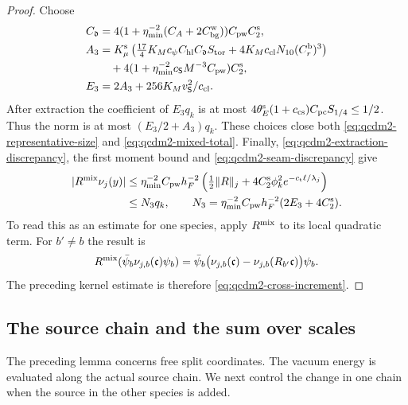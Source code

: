\documentclass[11pt,letterpaper,reqno]{amsart}
\theoremstyle{definition}
\theoremstyle{remark}
\begin{document}
\begin{proof}
Choose
\[
 \begin{split}
 C_{\mathfrak d}
 &=4(1+\eta_{\min}^{-2}(C_A+2C_{\rm bg}^{\rm w}))
                                      C_{\rm pw}C_2^{\rm s},\\
 A_3&=K_\mu^{\rm s}\left(
       \tfrac{17}{4}K_Mc_\psi C_{\rm hl}C_{\mathfrak d}S_{\rm tor}
           +4K_Mc_{\rm cl}N_{10}(C_r^{\rm b})^3\right)\\
 &\hspace{1em}
       +4(1+\eta_{\min}^{-2}c_{\mathsf S}M^{-3}C_{\rm pw})C_2^{\rm s},\\
 E_3&=2A_3+256K_Mv_{\mathsf S}^2/c_{\rm cl}.
 \end{split}
\]
After extraction the coefficient of $E_3q_k$ is at most
$4\theta_E^{\rm s}(1+c_{\rm cs})C_{\rm pc}S_{1/4}\le1/2$.
Thus the norm is at most $(E_3/2+A_3)q_k$.
These choices close both \eqref{eq:qcdm2-representative-size} and
\eqref{eq:qcdm2-mixed-total}.  Finally,
\eqref{eq:qcdm2-extraction-discrepancy}, the first
moment bound and \eqref{eq:qcdm2-seam-discrepancy} give
\begin{align*}
 |R^{\rm mix}\nu_j(y)|
 &\le\eta_{\min}^{-2}C_{\rm pw}h_F^{-2}
     \left(\tfrac12\|R\|_j
           +4C_2^{\rm s}\phi_k^2
                         e^{-c_{\rm t}\ell/\lambda_j}\right)\\
 &\le N_3q_k,
 \qquad
 N_3=\eta_{\min}^{-2}C_{\rm pw}h_F^{-2}(2E_3+4C_2^{\rm s}).
\end{align*}
To read this as an estimate for one species, apply
$R^{\rm mix}$ to its local quadratic term.  For
$b'\ne b$ the result is
\[
 R^{\rm mix}(\bar\psi_b\nu_{j,b}(\mathfrak c)\psi_b)
   =\bar\psi_b\bigl(\nu_{j,b}(\mathfrak c)
                    -\nu_{j,b}(R_{b'}\mathfrak c)\bigr)\psi_b.
\]
The preceding kernel estimate is therefore
\eqref{eq:qcdm2-cross-increment}.
\end{proof}

\subsection{The source chain and the sum over scales}

The preceding lemma concerns free split coordinates.  The
vacuum energy is evaluated along the actual source chain.
We next control the change in one chain when the source in
the other species is added.
\end{document}
